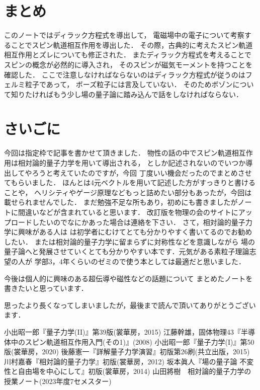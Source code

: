 \documentclass[a4paper,11pt]{jsarticle}
\numberwithin{equation}{section}
\begin{document}
\section{まとめ}
このノートではディラック方程式を導出して，
電磁場中の電子について考察することでスピン軌道相互作用を導出した．
その際，古典的に考えたスピン軌道相互作用とズレについても修正された．
またディラック方程式を考えることでスピンの概念が必然的に導入され，
そのスピンが磁気モーメントを持つことを確認した．
ここで注意しなければならないのはディラック方程式が従うのはフェルミ粒子であって，
ボーズ粒子には言及していない．
そのためボゾンについて知りたければもう少し場の量子論に踏み込んで話をしなければならない．


\section{さいごに}
今回は指定枠で記事を書かせて頂きました．
物性の話の中でスピン軌道相互作用は相対論的量子力学を用いて導出される，
としか記述されないのでいつか導出してやろうと考えていたのですが，今回
丁度いい機会だったのでまとめさせてもらいました．
ほんとは4元ベクトルを用いて記述した方がすっきりと書けることや，
ヘリシティやゲージ原理などもっと詰めたい部分もあったが，今回は載せられませんでした．
まだ勉強不足な所もあり，初めにも書きましたがノートに間違いなどが含まれていると思います．
改訂版を物理の会のサイトにアップロードしたいのでなにかあった場合は連絡を下さい．
さて，相対論的量子力学に興味がある人は
\cite{神}は初学者にむけてとても分かりやすく書いてるのでお勧めしたい．
また\cite{坂本}は相対論的量子力学に留まらずに対称性などを意識しながら
場の量子論へと発展させていくとても分かりやすい本です．元気がある素粒子理論志望の人が
学部3，4年くらいのゼミので使う本としては最適だと思いました．

今後は個人的に興味のある超伝導や磁性などの話題について
まとめたノートを書きたいと思っています．

思ったより長くなってしまいましたが，最後まで読んで頂いてありがとうございます．




\begin{thebibliography}{99}
  小出昭一郎『量子力学(II)』第39版(裳華房，2015)
  江藤幹雄，固体物理43『半導体中のスピン軌道相互作用入門(その1)』(2008)
  小出昭一郎『量子力学(I)』第50版(裳華房，2020)
  後藤憲一『詳解量子力学演習』初版第26刷(共立出版，2015)
  川村嘉春『相対論的量子力学』初版(裳華房，2012)
  坂本眞人『場の量子論 不変性と自由場を中心にして』初版(裳華房，2014)
  山田將樹　相対論的量子力学の授業ノート(2023年度7セメスター)
\end{thebibliography}
\end{document}
